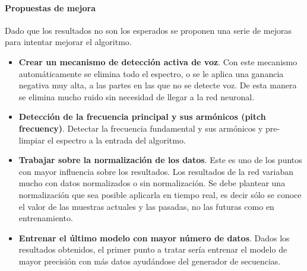 \paragraph{Propuestas de mejora}
Dado que los resultados no son los esperados se proponen una serie de mejoras para intentar mejorar el algoritmo.
\begin{itemize}
	\item \textbf{Crear un mecanismo de detección activa de voz}. Con este mecanismo automáticamente se elimina todo el espectro, o se le aplica una ganancia negativa muy alta, a las partes en las que no se detecte voz. De esta manera se elimina mucho ruido sin necesidad de llegar a la red neuronal.
	\item \textbf{Detección de la frecuencia principal y sus armónicos (pitch frecuency)}. Detectar la frecuencia fundamental y sus armónicos y pre-limpiar el espectro a la entrada del algoritmo.
	\item \textbf{Trabajar sobre la normalización de los datos}. Este es uno de los puntos con mayor influencia sobre los resultados. Los resultados de la red variaban mucho con datos normalizados o sin normalización. Se debe plantear una normalización que sea posible aplicarla en tiempo real, es decir sólo se conoce el valor de las muestras actuales y las pasadas, no las futuras como en entrenamiento.
	\item \textbf{Entrenar el último modelo con mayor número de datos}. Dados los resultados obtenidos, el primer punto a tratar sería entrenar el modelo de mayor precisión con más datos ayudándose del generador de secuencias.
\end{itemize}